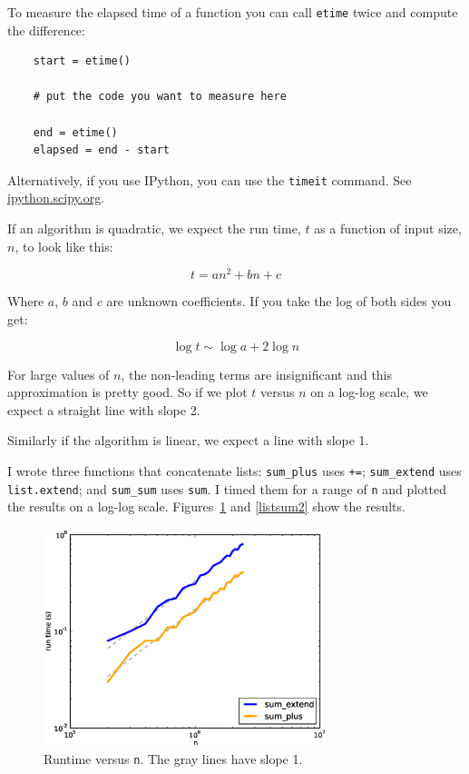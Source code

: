 \documentclass[10pt]{book}
\begin{document}
To measure the elapsed time of a function you can call
{\tt etime} twice and compute the difference:

\begin{verbatim}
    start = etime()

    # put the code you want to measure here

    end = etime()
    elapsed = end - start
\end{verbatim}

Alternatively, if you use IPython, you can use the
{\tt timeit} command. See \url{ipython.scipy.org}.

If an algorithm is quadratic, we expect the run time, $t$
as a function of input size, $n$, to look like this:

\[ t = a n^2 + b n + c \]

Where $a$, $b$ and $c$ are unknown coefficients.  If you take
the log of both sides you get:

\[ \log t \sim \log a + 2 \log n \]

For large values of $n$, the non-leading terms are insignificant
and this approximation is pretty good.  So if we plot $t$
versus $n$ on a log-log scale, we expect a straight line
with slope 2.

Similarly if the algorithm is linear, we expect a line with
slope 1.

I wrote three functions that concatenate lists: \verb"sum_plus" uses
{\tt +=}; \verb"sum_extend" uses {\tt list.extend}; and \verb"sum_sum"
uses {\tt sum}.  I timed them for a range of {\tt n} and plotted the
results on a log-log scale.  Figures~\ref{listsum1} and \ref{listsum2} show the
results.

\begin{figure}
\label{listsum1}
\centerline{\includegraphics[height=2.5in]{figs/listsum1.eps}}
\caption{Runtime versus {\tt n}.  The gray lines have slope 1.}
\end{figure}
\end{document}
